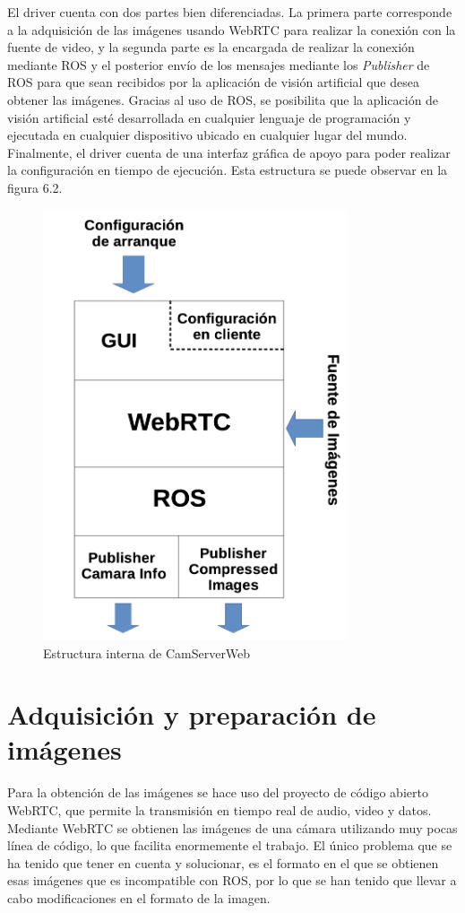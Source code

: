 El driver cuenta con dos partes bien diferenciadas. La primera parte corresponde a la adquisición de las imágenes usando WebRTC para realizar la conexión con la fuente de video, y la segunda parte es la encargada de realizar la conexión mediante ROS y el posterior envío de los mensajes mediante los \textit{Publisher} de ROS para que sean recibidos por la aplicación de visión artificial que desea obtener las imágenes. Gracias al uso de ROS, se posibilita que la aplicación de visión artificial esté desarrollada en cualquier lenguaje de programación y ejecutada en cualquier dispositivo ubicado en cualquier lugar del mundo. Finalmente, el driver cuenta de una interfaz gráfica de apoyo para poder realizar la configuración en tiempo de ejecución. Esta estructura se puede observar en la figura 6.2.
\begin{figure}[H]
  \begin{center}
    \includegraphics[width=0.8\textwidth]{figures/cajablancacamserver.png}
		\caption{Estructura interna de CamServerWeb}
		\label{fig.estructuracamserver}
		\end{center}
\end{figure}

\section{Adquisición y preparación de imágenes}
Para la obtención de las imágenes se hace uso del proyecto de código abierto WebRTC, que permite la transmisión en tiempo real de audio, video y datos.
Mediante WebRTC se obtienen las imágenes de una cámara utilizando muy pocas línea de código, lo que facilita enormemente el trabajo. El único problema que se ha tenido que tener en cuenta y solucionar, es el formato en el que se obtienen esas imágenes que es incompatible con ROS, por lo que se han tenido que llevar a cabo modificaciones en el formato de la imagen.

